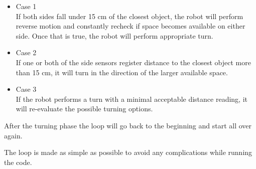 \begin{itemize}

\item Case 1 \\ If both sides fall under 15 cm of the closest object, the robot will perform reverse motion and constantly recheck if space becomes available on either side. Once that is true, the robot will perform appropriate turn. 
\item Case 2 \\ If one or both of the side sensors register distance to the closest object more than 15 cm, it will turn in the direction of the larger available space.
\item Case 3 \\ If the robot performs a turn with a minimal acceptable distance reading, it will re-evaluate the possible turning options.

\end{itemize}

After the turning phase the loop will go back to the beginning and start all over again.

The loop is made as simple as possible to avoid any complications while running the code.

